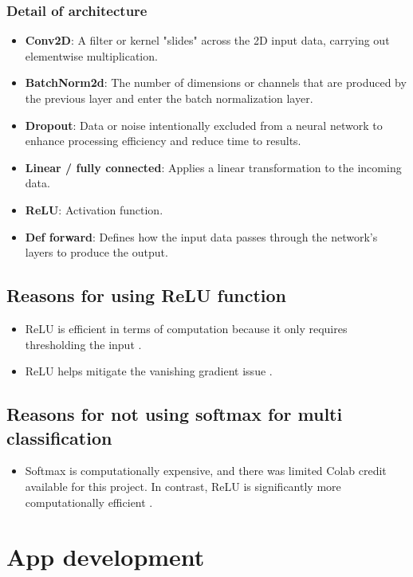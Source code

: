 \documentclass[a4paper,oneside,11pt]{book}
\begin{document}
\subsection{Detail of architecture}
\begin{itemize}
    \item \textbf{Conv2D}: A filter or kernel "slides" across the 2D input data, carrying out elementwise multiplication.
    \item \textbf{BatchNorm2d}: The number of dimensions or channels that are produced by the previous layer and enter the batch normalization layer.
    \item \textbf{Dropout}: Data or noise intentionally excluded from a neural network to enhance processing efficiency and reduce time to results.
    \item \textbf{Linear / fully connected}:  Applies a linear transformation to the incoming data.
    \item \textbf{ReLU}: Activation function.
    \item \textbf{Def forward}:  Defines how the input data passes through the network's layers to produce the output.
\end{itemize}
\section{Reasons for using ReLU function}
\begin{itemize}
    \item ReLU is efficient in terms of computation because it only requires thresholding the input \citep{choubey2023activation}.
    \item ReLU helps mitigate the vanishing gradient issue \citep{choubey2023activation}.
\end{itemize}
\section{Reasons for not using softmax for multi classification}
\begin{itemize}
    \item Softmax is computationally expensive, and there was limited Colab credit available for this project. In contrast, ReLU is significantly more computationally efficient \citep{choubey2023activation}.
\end{itemize}

\chapter{App development}
\end{document}
